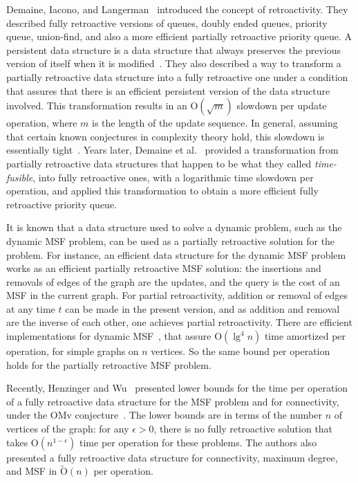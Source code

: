 \documentclass[reqno,11pt]{amsart}
\newcommand{\eps}{\epsilon}
\newcommand{\Oh}{\mathrm{O}}
\begin{document}
Demaine, Iacono, and Langerman~\cite{DemaineIL2007} introduced the concept of retroactivity. 
They described fully retroactive versions of queues, doubly ended queues, priority 
queue, union-find, and also a more efficient partially retroactive priority queue.
A persistent data structure is a data structure that always preserves the 
previous version of itself when it is modified~\cite{DriscollSST1989}.
They also described a way to transform a partially retroactive data structure 
into a fully retroactive one under a condition that assures that there is 
an efficient persistent version of the data structure involved.  
This transformation results in an $\Oh(\sqrt{m})$ 
slowdown per update operation, where $m$ is the length of the update sequence.
In general, assuming that certain known conjectures in complexity theory hold, 
this slowdown is essentially tight~\cite{ChenDGWXY2018}.
Years later, Demaine et al.~\cite{DemaineKLSY2015} provided a transformation 
from partially retroactive data structures that happen to be what they called 
\emph{time-fusible}, into fully retroactive ones, with a logarithmic time 
slowdown per operation, and applied this transformation to obtain a more 
efficient fully retroactive priority queue. 

It is known that a data structure used to solve a dynamic problem, such as the 
dynamic MSF problem, can be used as a partially retroactive solution for the problem.  
For instance, an efficient data structure for the dynamic MSF problem works as an 
efficient partially retroactive MSF solution: the insertions and removals of edges 
of the graph are the updates, and the query is the cost of an MSF in the current graph.  
For partial retroactivity, addition or removal of edges at any time $t$ can be made 
in the present version, and as addition and removal are the inverse of each other, 
one achieves partial retroactivity.  
There are efficient implementations for dynamic MSF~\cite{HolmLT2001,HolmRWN2015}, 
that assure $\Oh(\lg^4 n)$ time amortized per operation, for simple graphs on $n$ vertices. 
So the same bound per operation holds for the partially retroactive MSF problem. 

Recently, Henzinger and Wu~\cite{HenzingerW2021} presented lower bounds for the 
time per operation of a fully retroactive data structure for the MSF problem and 
for connectivity, under the OMv conjecture~\cite{HenzingerKNS2015}.  The lower 
bounds are in terms of the number $n$ of vertices of the graph: for any $\eps>0$,
there is no fully retroactive solution that takes $\Oh(n^{1-\eps})$ time per 
operation for these problems.  The authors also presented a fully retroactive
data structure for connectivity, maximum degree, and MSF in $\tilde{\Oh}(n)$ 
per operation.  
\end{document}
